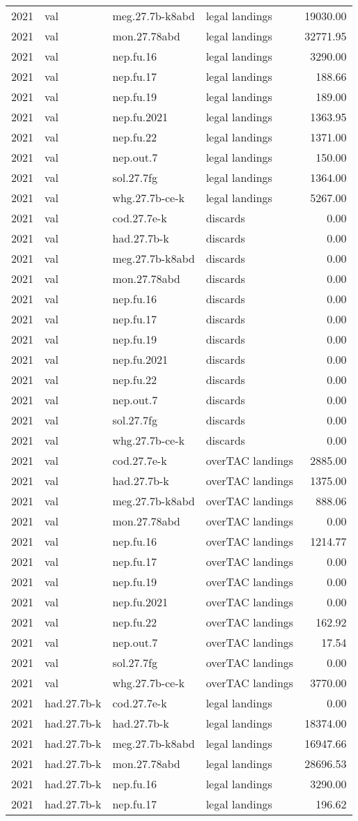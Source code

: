 \documentclass[
]{article}
\begin{document}
\begin{longtable}[]{@{}llllr@{}}
2021 & val & meg.27.7b-k8abd & legal landings & 19030.00\tabularnewline
2021 & val & mon.27.78abd & legal landings & 32771.95\tabularnewline
2021 & val & nep.fu.16 & legal landings & 3290.00\tabularnewline
2021 & val & nep.fu.17 & legal landings & 188.66\tabularnewline
2021 & val & nep.fu.19 & legal landings & 189.00\tabularnewline
2021 & val & nep.fu.2021 & legal landings & 1363.95\tabularnewline
2021 & val & nep.fu.22 & legal landings & 1371.00\tabularnewline
2021 & val & nep.out.7 & legal landings & 150.00\tabularnewline
2021 & val & sol.27.7fg & legal landings & 1364.00\tabularnewline
2021 & val & whg.27.7b-ce-k & legal landings & 5267.00\tabularnewline
2021 & val & cod.27.7e-k & discards & 0.00\tabularnewline
2021 & val & had.27.7b-k & discards & 0.00\tabularnewline
2021 & val & meg.27.7b-k8abd & discards & 0.00\tabularnewline
2021 & val & mon.27.78abd & discards & 0.00\tabularnewline
2021 & val & nep.fu.16 & discards & 0.00\tabularnewline
2021 & val & nep.fu.17 & discards & 0.00\tabularnewline
2021 & val & nep.fu.19 & discards & 0.00\tabularnewline
2021 & val & nep.fu.2021 & discards & 0.00\tabularnewline
2021 & val & nep.fu.22 & discards & 0.00\tabularnewline
2021 & val & nep.out.7 & discards & 0.00\tabularnewline
2021 & val & sol.27.7fg & discards & 0.00\tabularnewline
2021 & val & whg.27.7b-ce-k & discards & 0.00\tabularnewline
2021 & val & cod.27.7e-k & overTAC landings & 2885.00\tabularnewline
2021 & val & had.27.7b-k & overTAC landings & 1375.00\tabularnewline
2021 & val & meg.27.7b-k8abd & overTAC landings & 888.06\tabularnewline
2021 & val & mon.27.78abd & overTAC landings & 0.00\tabularnewline
2021 & val & nep.fu.16 & overTAC landings & 1214.77\tabularnewline
2021 & val & nep.fu.17 & overTAC landings & 0.00\tabularnewline
2021 & val & nep.fu.19 & overTAC landings & 0.00\tabularnewline
2021 & val & nep.fu.2021 & overTAC landings & 0.00\tabularnewline
2021 & val & nep.fu.22 & overTAC landings & 162.92\tabularnewline
2021 & val & nep.out.7 & overTAC landings & 17.54\tabularnewline
2021 & val & sol.27.7fg & overTAC landings & 0.00\tabularnewline
2021 & val & whg.27.7b-ce-k & overTAC landings & 3770.00\tabularnewline
2021 & had.27.7b-k & cod.27.7e-k & legal landings & 0.00\tabularnewline
2021 & had.27.7b-k & had.27.7b-k & legal landings &
18374.00\tabularnewline
2021 & had.27.7b-k & meg.27.7b-k8abd & legal landings &
16947.66\tabularnewline
2021 & had.27.7b-k & mon.27.78abd & legal landings &
28696.53\tabularnewline
2021 & had.27.7b-k & nep.fu.16 & legal landings & 3290.00\tabularnewline
2021 & had.27.7b-k & nep.fu.17 & legal landings & 196.62\tabularnewline

\end{longtable}
\end{document}
